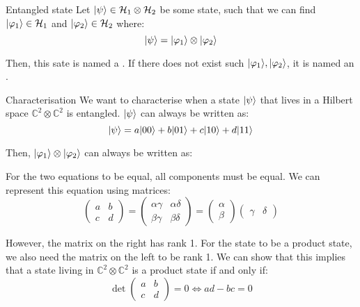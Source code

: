 \documentclass[a4paper]{article}
\begin{document}
\begin{parag}{Entangled state}
    Let $\ket{\psi} \in \mathcal{H}_1 \otimes \mathcal{H}_2$ be some state, such that we can find $\ket{\phi_1} \in \mathcal{H}_1$ and $\ket{\phi_2} \in \mathcal{H}_2$ where: 
    \[\ket{\psi} = \ket{\phi_1} \otimes \ket{\phi_2}\]
    
    Then, this sate is named a . If there does not exist such $\ket{\phi_1}, \ket{\phi_2}$, it is named an .

    \begin{subparag}{Characterisation}
        We want to characterise when a state $\ket{\psi}$ that lives in a Hilbert space $\mathbb{C}^2 \otimes \mathbb{C}^2$ is entangled. $\ket{\psi}$ can always be written as: 
        \[\ket{\psi} = a \ket{00} + b \ket{01} + c \ket{10} + d \ket{11}\]

        Then, $\ket{\phi_1} \otimes \ket{\phi_2}$ can always be written as: 
        
        For the two equations to be equal, all components must be equal. We can represent this equation using matrices:
        \[\begin{pmatrix} a & b \\ c & d \end{pmatrix} = \begin{pmatrix} \alpha \gamma & \alpha \delta \\ \beta \gamma &  \beta \delta \end{pmatrix} = \begin{pmatrix} \alpha \\ \beta \end{pmatrix} \begin{pmatrix} \gamma & \delta \end{pmatrix}\]
        
        However, the matrix on the right has rank 1. For the state to be a product state, we also need the matrix on the left to be rank 1. We can show that this implies that a state living in $\mathbb{C}^2 \otimes \mathbb{C}^2$ is a product state if and only if: 
        \[\det \begin{pmatrix} a & b \\ c & d \end{pmatrix} = 0 \iff ad - bc = 0\]
    \end{subparag}
\end{parag}
\end{document}
